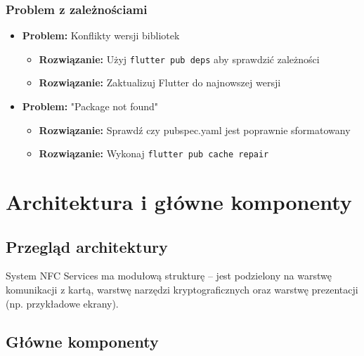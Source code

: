 \documentclass[a4paper,12pt]{article}
\begin{document}
\subsubsection{Problem z zależnościami}
\begin{itemize}
    \item \textbf{Problem:} Konflikty wersji bibliotek
    \begin{itemize}
        \item \textbf{Rozwiązanie:} Użyj \texttt{flutter pub deps} aby sprawdzić zależności
        \item \textbf{Rozwiązanie:} Zaktualizuj Flutter do najnowszej wersji
    \end{itemize}
    
    \item \textbf{Problem:} "Package not found"
    \begin{itemize}
        \item \textbf{Rozwiązanie:} Sprawdź czy pubspec.yaml jest poprawnie sformatowany
        \item \textbf{Rozwiązanie:} Wykonaj \texttt{flutter pub cache repair}
    \end{itemize}
\end{itemize}

\section{Architektura i główne komponenty}

\subsection{Przegląd architektury}
System NFC Services ma modułową strukturę – jest podzielony na warstwę komunikacji z kartą, warstwę narzędzi kryptograficznych oraz warstwę prezentacji (np. przykładowe ekrany).

\subsection{Główne komponenty}
\end{document}
